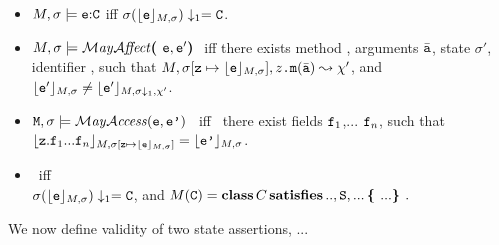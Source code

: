 \begin{definition}
\begin{itemize}
  \item
 $\M,\sigma  \models  \syntax{\sE}\kw{:}\prg{C}$ iff  $\sigma(\interp{ \syntax{\sE}}{\M,\sigma})\downarrow_1 = \prg{C}$.
 
 \item 
$\M,\sigma  \models \MayAffect \lp\syntax{\sE},\syntax{\sE'}\rp$ iff  
there exists method , arguments $\bar{\prg{a}}$, state $\sigma'$, identifier , such that
    $ \M, \sigma[\prg{z}\mapsto \interp {\syntax{\sE}} {\M,\sigma}], \syntax{z}\prg{.m}(\bar{\prg{a}}) \leadsto   \chi'$, and   $\interp {\syntax{\sE'}} {\M,\sigma} \neq  \interp {\syntax{\toby{\sE'}}} {\M,\sigma\downarrow_1,\chi'}    $.
\item
$\Prog{},\sigma \models { \MayAccess}(\prg{\sE},\prg{\sE'})$   \ iff \  there exist  fields  $\prg{f}_1$,... $\prg{f}_n$, such that
      $\interp{\prg{z}.\prg{f}_1...\prg{f}_n}{\M,\sigma[\prg{z}\mapsto \interp {\syntax{\sE}} {\M,\sigma}]}= \interp {\prg{\sE'} }{\M,\sigma}$.
  \item
{} \  iff  \\
 $\sigma(\interp{ \syntax{\sE}}{\M,\sigma})\downarrow_1 = \prg{C}$, 
 and 
 $M(\prg{C}) = \kw{class}\,C\, \kw{satisfies}\,.., \prg{S}, ...\, \lb ... \rb.$

 \end{itemize} 
 \end{definition}
 

We now define validity of two state assertions, ...

